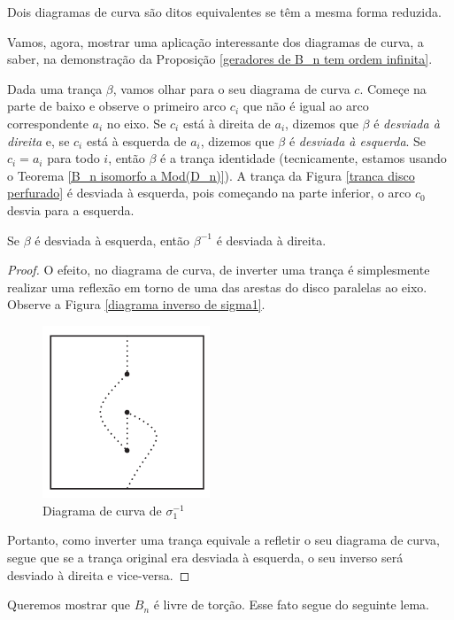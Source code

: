 	\begin{deff}
		\label{def equivalencia diagramas}
		Dois diagramas de curva são ditos equivalentes se têm a mesma forma reduzida.
	\end{deff}  
	\par\vspace{0.3cm} Vamos, agora, mostrar uma aplicação interessante dos diagramas de curva, a saber, na demonstração da Proposição \eqref{geradores de B_n tem ordem infinita}.
	\par\vspace{0.3cm} Dada uma trança $\beta$, vamos olhar para o seu diagrama de curva $c$. Começe na parte de baixo e observe o primeiro arco $c_i$ que não é igual ao arco correspondente $a_i$ no eixo. Se $c_i$ está à direita de $a_i$, dizemos que $\beta$ é \textit{desviada à direita} e, se $c_i$ está à esquerda de $a_i$, dizemos que $\beta$ é \textit{desviada à esquerda}. Se $c_i = a_i$ para todo $i$, então $\beta$ é a trança identidade (tecnicamente, estamos usando o Teorema \eqref{B_n isomorfo a Mod(D_n)}). A trança da Figura \eqref{tranca disco perfurado} é desviada à esquerda, pois começando na parte inferior, o arco $c_0$ desvia para a esquerda.
	\begin{prop}
		\label{desvio a direita desvio a esquerda}
		Se $\beta$ é desviada à esquerda, então $\beta^{-1}$ é desviada à direita.
	\end{prop}
	\begin{proof}
		O efeito, no diagrama de curva, de inverter uma trança é simplesmente realizar uma reflexão em torno de uma das arestas do disco paralelas ao eixo. Observe a Figura \eqref{diagrama inverso de sigma1}.
		\begin{figure}[H]
			\begin{center}
				\includegraphics[width=5cm]{Images/inverso.png}
			\end{center}\caption{Diagrama de curva de $\sigma_1^{-1}$}\label{diagrama inverso de sigma1}
		\end{figure}
		\par\vspace{0.3cm} Portanto, como inverter uma trança equivale a refletir o seu diagrama de curva, segue que se a trança original era desviada à esquerda, o seu inverso será desviado à direita e vice-versa.
	\end{proof}
	\par\vspace{0.3cm} Queremos mostrar que $B_n$ é livre de torção. Esse fato segue do seguinte lema.
	
